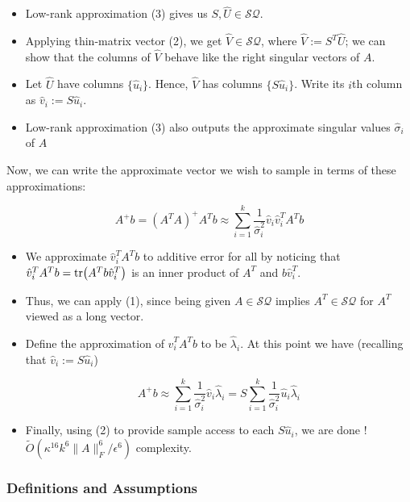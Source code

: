 \documentclass[main.tex]{subfiles}
\begin{document}
\begin{algorithm}   	
\begin{itemize}
\item Low-rank approximation (3) gives us $S,\hat{U} \in \mathcal{SQ}$.

\item Applying thin-matrix vector (2), we get $\hat{V} \in \mathcal{SQ}$, where $\hat{V} := S^T\hat{U}$; we can show that the columns of $\hat{V}$ behave like the right singular vectors of $A$.
\item Let $\hat{U}$ have columns $\{ \hat{u}_i\}$. Hence, $\hat{V}$ has columns $\{ S \hat{u}_i \}$. Write its $i$th column as $\hat{v}_i := S\hat{u}_i$.

\item Low-rank approximation (3) also outputs the approximate singular values $\hat{\sigma}_i$ of $A$
\end{itemize}
\end{algorithm}

Now, we can write the approximate vector we wish to sample in terms of these approximations:

$$A^+b = (A^TA)^+A^Tb \approx \sum_{i=1}^k \frac{1}{\hat{\sigma}_i^2}\hat{v}_i\hat{v}_i^T A^Tb$$

\begin{itemize}
\item We approximate $\hat{v}_i^TA^Tb$ to additive error for all by noticing that $\hat{v}_i^TA^Tb = \tr(A^Tb\hat{v}_i^T)$ is an inner product of $A^T$ and $b\hat{v}_i^T$. 
\item Thus, we can apply (1), since being given $A \in \mathcal{SQ}$ implies $A^T \in \mathcal{SQ}$ for $A^T$ viewed as a long vector. 
\item Define the approximation of $\hat{v}_i^TA^Tb$ to be $\hat{\lambda}_i$. At this point we have (recalling that $\hat{v}_i := S\hat{u}_i$)

$$A^+b \approx \sum_{i=1}^k \frac{1}{\hat{\sigma}_i^2}\hat{v}_i\hat{\lambda}_i = S \sum_{i=1}^k \frac{1}{\hat{\sigma}_i^2}\hat{u}_i\hat{\lambda}_i$$

\item Finally, using (2) to provide sample access to each $S \hat{u}_i$, we are done	! $\tilde{O}(\kappa^{16}k^6 \|A\|^6_F / \epsilon^6)$ complexity.
\end{itemize}


\subsubsection{Definitions and Assumptions}
\end{document}
